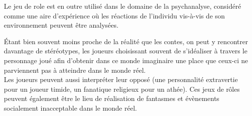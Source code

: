 Le jeu de role est en outre utilisé dans le domaine de la psychanalyse, considéré comme une aire d'expérience où les réactions de l'individu vis-à-vis de son environnement peuvent être analysées.

Étant bien souvent moins proche de la réalité que les contes, on peut y rencontrer davantage de stéréotypes, les joueurs choisissant souvent de s'idéaliser à travers le personnage joué afin d'obtenir dans ce monde imaginaire une place que ceux-ci ne parviennent pas à atteindre dans le monde réel.\\
Les joueurs peuvent aussi interpréter leur opposé (une personnalité extravertie pour un joueur timide, un fanatique religieux pour un athée). Ces jeux de rôles peuvent également être le lieu de réalisation de fantasmes et évènements socialement inacceptable dans le monde réel.

\clearpage
